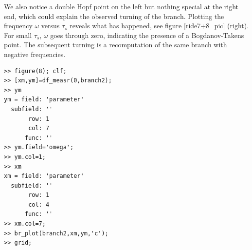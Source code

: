 \documentclass[10pt]{article}
\begin{document}
{We also notice a double Hopf point on the left but nothing special at the
right end, which could explain the observed turning of the branch.
Plotting the frequency $\omega$ versus $\tau_s$ reveals what has happened,
see figure \ref{ride7+8_pic} (right).
For small $\tau_s$, $\omega$ goes through zero, indicating the presence
of a Bogdanov-Takens point. The subsequent turning is a recomputation
of the same branch with negative frequencies.
{\small\begin{verbatim}
>> figure(8); clf;
>> [xm,ym]=df_measr(0,branch2);
>> ym
ym = field: 'parameter'
  subfield: ''
       row: 1
       col: 7
      func: ''
>> ym.field='omega';
>> ym.col=1;
>> xm
xm = field: 'parameter'
  subfield: ''
       row: 1
       col: 4
      func: ''
>> xm.col=7;
>> br_plot(branch2,xm,ym,'c');
>> grid;
\end{verbatim}}
\begin{figure}[h]
\begin{center}

\end{center}
\end{figure}}
\end{document}
